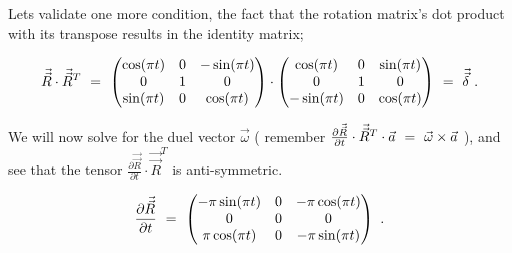 \documentclass{article}
\begin{document}
Lets validate one more condition, the fact that the rotation matrix's dot product with its transpose results in the identity matrix;

\begin{equation} \label{eb-eq-1-62}
\vec{\vec{R}} \cdot \vec{\vec{R}}^{T} \hspace{0.125cm} =  \hspace{0.125cm} \begin{pmatrix} \cos ( \pi t ) & 0 & - \sin ( \pi t ) \\ 0 & 1 & 0 \\ \sin ( \pi t ) & 0 & \cos ( \pi t ) \end{pmatrix} \cdot \begin{pmatrix} \cos ( \pi t ) & 0 & \sin ( \pi t ) \\ 0 & 1 & 0 \\ - \sin ( \pi t ) & 0 & \cos ( \pi t ) \end{pmatrix} \hspace{0.125cm} =  \hspace{0.125cm} \vec{\vec{\delta}} \hspace{0.125cm} .
\end{equation} 

We will now solve for the duel vector \begin{math} \vec{\omega} \end{math} ( remember \begin{math} \frac{\partial{\vec{\vec{R}}}}{\partial{t}} \cdot \vec{\vec{R}}^{T} \cdot \vec{a} \hspace{0.125cm} =  \hspace{0.125cm} \vec{\omega} \times \vec{a} \end{math} ), and see that the tensor \begin{math} \frac{\partial{\vec{\vec{R}}}}{\partial{t}} \cdot \vec{\vec{R}}^{T} \end{math} is anti-symmetric. 

\begin{equation} \label{eb-eq-1-63}
\frac{\partial{\vec{\vec{R}}}}{\partial{t}} \hspace{0.125cm} =  \hspace{0.125cm} \begin{pmatrix} - \pi \sin ( \pi t ) & 0 & - \pi \cos ( \pi t ) \\ 0 & 0 & 0 \\ \pi \cos ( \pi t ) & 0 & - \pi \sin ( \pi t ) \end{pmatrix} \hspace{0.125cm} .
\end{equation} 
\end{document}
